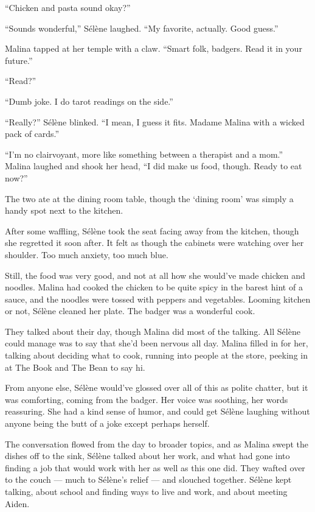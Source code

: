 ``Chicken and pasta sound okay?''

``Sounds wonderful,'' Sélène laughed. ``My favorite, actually. Good guess.''

Malina tapped at her temple with a claw. ``Smart folk, badgers. Read it in your future.''

``Read?''

``Dumb joke. I do tarot readings on the side.''

``Really?'' Sélène blinked. ``I mean, I guess it fits. Madame Malina with a wicked pack of cards.''

``I'm no clairvoyant, more like something between a therapist and a mom.'' Malina laughed and shook her head, ``I did make us food, though. Ready to eat now?''

The two ate at the dining room table, though the `dining room' was simply a handy spot next to the kitchen.

After some waffling, Sélène took the seat facing away from the kitchen, though she regretted it soon after. It felt as though the cabinets were watching over her shoulder. Too much anxiety, too much blue.

Still, the food was very good, and not at all how she would've made chicken and noodles. Malina had cooked the chicken to be quite spicy in the barest hint of a sauce, and the noodles were tossed with peppers and vegetables. Looming kitchen or not, Sélène cleaned her plate. The badger was a wonderful cook.

They talked about their day, though Malina did most of the talking. All Sélène could manage was to say that she'd been nervous all day. Malina filled in for her, talking about deciding what to cook, running into people at the store, peeking in at The Book and The Bean to say hi.

From anyone else, Sélène would've glossed over all of this as polite chatter, but it was comforting, coming from the badger. Her voice was soothing, her words reassuring. She had a kind sense of humor, and could get Sélène laughing without anyone being the butt of a joke except perhaps herself.

The conversation flowed from the day to broader topics, and as Malina swept the dishes off to the sink, Sélène talked about her work, and what had gone into finding a job that would work with her as well as this one did. They wafted over to the couch --- much to Sélène's relief --- and slouched together. Sélène kept talking, about school and finding ways to live and work, and about meeting Aiden.

